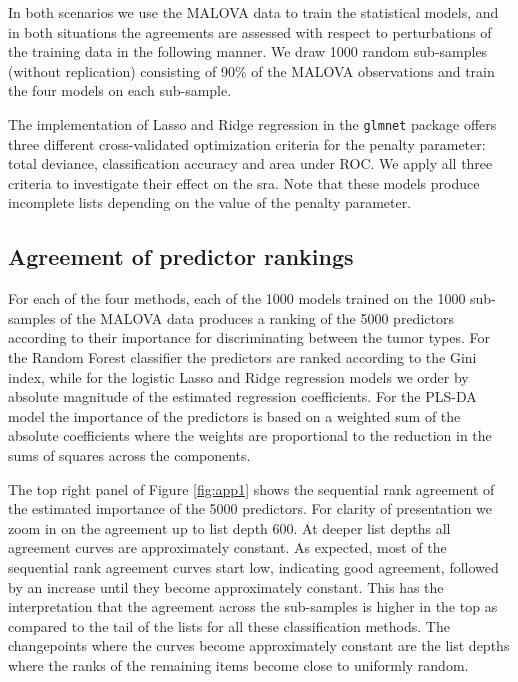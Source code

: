 \documentclass[oupdraft]{bio}
\begin{document}
In both scenarios we use the MALOVA data to train the statistical
models, and in both situations the agreements are assessed with
respect to perturbations of the training data in the following
manner. We draw 1000 random sub-samples (without replication)
consisting of 90\% of the MALOVA observations and train the four
models on each sub-sample.


The implementation of Lasso and Ridge regression in the
\texttt{glmnet} package offers three different cross-validated
optimization criteria for the penalty parameter: total deviance,
classification accuracy and area under ROC. We apply all three
criteria to investigate their effect on the sra.
Note that these models produce incomplete lists depending on
the value of the penalty parameter.


\subsection{Agreement of predictor rankings}
For each of the four methods, each of the 1000 models trained on
the 1000 sub-samples of the MALOVA data produces a ranking of the 5000
predictors according to their importance for discriminating between
the tumor types. For the Random Forest classifier the predictors are ranked according
to the Gini index, while for the logistic Lasso and Ridge regression
models we order by absolute magnitude of the estimated
regression coefficients. For the PLS-DA model the importance of the
predictors is based on a weighted sum of the absolute coefficients
where the weights are proportional to the reduction in the sums of
squares across the components.

The top right panel of Figure \ref{fig:app1} shows the sequential rank
agreement of the estimated importance of the 5000 predictors.  For
clarity of presentation we zoom in on the agreement up to list depth
600. At deeper list depths all agreement curves are approximately constant.
%
As expected, most of the sequential rank agreement curves start low,
indicating good agreement, followed by an increase until they become
approximately constant. This has the interpretation that the
agreement across the sub-samples is higher in the top as
compared to the tail of the lists for all these classification
methods. The changepoints where the curves become approximately
constant are the list depths where the ranks of the remaining items
become close to uniformly random.
\end{document}
